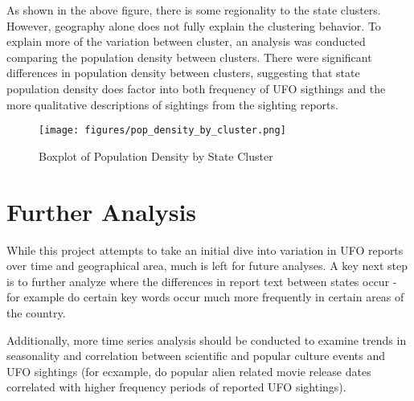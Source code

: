 \documentclass{article}
\begin{document}
\par As shown in the above figure, there is some regionality to the state clusters. However, geography alone does not fully explain the clustering behavior. To explain more of the variation between cluster, an analysis was conducted comparing the population density between clusters. There were significant differences in population density between clusters, suggesting that state population density does factor into both frequency of UFO sigthings and the more qualitative descriptions of sightings from the sighting reports. 

\begin{figure}[H]
  \centering
  \texttt{[image: figures/pop\_density\_by\_cluster.png]}
  \caption{Boxplot of Population Density by State Cluster}
  \label{fig:clusteR_pop_density}
\end{figure}

\section{Further Analysis}

\par While this project attempts to take an initial dive into variation in UFO reports over time and geographical area, much is left for future analyses. A key next step is to further analyze where the differences in report text between states occur - for example do certain key words occur much more frequently in certain areas of the country. 
\par Additionally, more time series analysis should be conducted to examine trends in seasonality and correlation between scientific and popular culture events and UFO sightings (for ecxample, do popular alien related movie release dates correlated with higher frequency periods of reported UFO sightings). 
\end{document}
